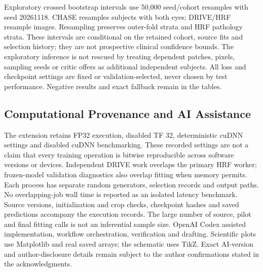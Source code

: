 \documentclass[jimaging,article,submit,pdftex,moreauthors]{Definitions/mdpi}
\begin{document}
Exploratory crossed bootstrap intervals use 50,000 seed/cohort resamples with
seed 20261118. CHASE resamples subjects with both eyes; DRIVE/HRF resample
images. Resampling preserves outer-fold strata and HRF pathology strata.
These intervals are conditional on the retained cohort, source fits and
selection history; they are not prospective clinical confidence bounds.
The exploratory inference is not rescued by treating dependent patches,
pixels, sampling seeds or critic offers as additional independent subjects.
All loss and checkpoint settings are fixed or validation-selected, never chosen
by test performance. Negative results and exact fallback remain in the tables.

\subsection{Computational Provenance and AI Assistance}
The extension retains FP32 execution, disabled TF 32, deterministic cuDNN
settings and disabled cuDNN benchmarking. These recorded settings are not a
claim that every training operation is bitwise reproducible across software
versions or devices. Independent DRIVE work overlaps the primary HRF worker;
frozen-model validation diagnostics also overlap fitting when memory permits.
Each process has separate random generators, selection records and output
paths. No overlapping-job wall time is reported as an isolated latency
benchmark. Source versions, initialization and crop checks, checkpoint hashes
and saved predictions accompany the execution records. The large number of
source, pilot and final fitting calls is not an inferential sample size.
OpenAI Codex assisted implementation, workflow orchestration, verification and
drafting. Scientific plots use Matplotlib and real saved arrays; the schematic
uses TikZ. Exact AI-version and author-disclosure details remain subject to
the author confirmations stated in the acknowledgments.
\end{document}
